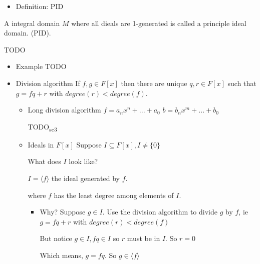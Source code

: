 \documentclass[11pt]{article}
\newcommand{\la}{\ensuremath{\langle}}
\newcommand{\ra}{\ensuremath{\rangle}}
\newcommand{\bse}{\ensuremath{\subseteq}}
\begin{document}
\begin{itemize}
\item Definition: PID
\end{itemize}
A integral domain \(M\) where all dieals are 1-generated is called a principle ideal domain. (PID).

TODO
\begin{itemize}
\item Example
TODO
\item Division algorithm
If \(f, g \in F[x]\) then there are unique \(q,r \in F[x]\) such that
\(g = fq + r\) with \(degree(r) < degree(f)\).

\begin{itemize}
\item Long division algorithm
\(f = a_nx^n + ... + a_0\)
\(b = b_nx^m + ... + b_0\)

TODO\textsubscript{sc3}

\item Ideals in \(F[x]\)
Suppose \(I \bse F[x], I \neq \{0\}\)

What does \(I\) look like?

\(I = \la f\ra\) the ideal generated by \(f\).

where \(f\) has the least degree among elements of \(I\).

\begin{itemize}
\item Why?
Suppose \(g \in I\).
Use the division algorithm to divide \(g\) by \(f\), ie $g = fq + r $
with \(degree(r) < degree(f)\)

But notice \(g \in I, fq \in I\) so \(r\) must be in \(I\).
So \(r = 0\)

Which means, \(g = fq\). So \(g \in \la f\ra\)
\end{itemize}
\end{itemize}
\end{itemize}
\end{document}
